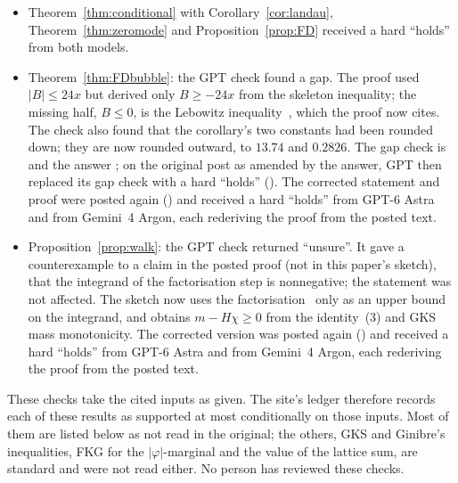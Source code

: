\begin{itemize}
\item Theorem~\ref{thm:conditional} with Corollary~\ref{cor:landau}, Theorem~\ref{thm:zeromode} and Proposition~\ref{prop:FD} received a hard ``holds'' from both models.
\item Theorem~\ref{thm:FDbubble}: the GPT check found a gap. The proof used $|B|\le24x$ but derived only $B\ge-24x$ from the skeleton inequality; the missing half, $B\le0$, is the Lebowitz inequality~\cite{Leb74,SG73}, which the proof now cites. The check also found that the corollary's two constants had been rounded down; they are now rounded outward, to $13.74$ and $0.2826$. The gap check is  and the answer ; on the original post as amended by the answer, GPT then replaced its gap check with a hard ``holds'' (). The corrected statement and proof were posted again () and received a hard ``holds'' from GPT-6 Astra and from Gemini~4 Argon, each rederiving the proof from the posted text.
\item Proposition~\ref{prop:walk}: the GPT check returned ``unsure''. It gave a counterexample to a claim in the posted proof (not in this paper's sketch), that the integrand of the factorisation step is nonnegative; the statement was not affected. The sketch now uses the factorisation~\cite[(11.30)]{FFS92} only as an upper bound on the integrand, and obtains $m-H\chi\ge0$ from the identity~(3) and GKS mass monotonicity. The corrected version was posted again () and received a hard ``holds'' from GPT-6 Astra and from Gemini~4 Argon, each rederiving the proof from the posted text.
\end{itemize}
These checks take the cited inputs as given. The site's ledger therefore records each of these results as supported at most conditionally on those inputs. Most of them are listed below as not read in the original; the others, GKS and Ginibre's inequalities, FKG for the $|\varphi|$-marginal and the value of the lattice sum, are standard and were not read either. No person has reviewed these checks.

